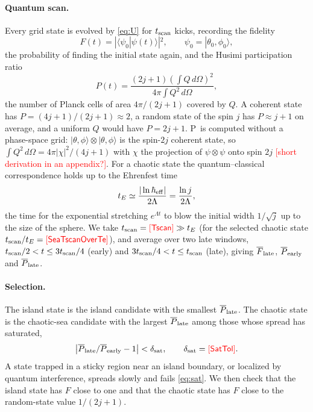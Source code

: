 \documentclass[aps,pra,twocolumn,superscriptaddress,nofootinbib]{revtex4-2}
\newcommand{\PH}[1]{\textcolor{red}{[\textsf{#1}]}}
\newcommand{\num}[1]{\ifcsname Num#1\endcsname\csname Num#1\endcsname\else\PH{#1}\fi}
\newcommand{\tscan}{t_{\rm scan}}          %
\newcommand{\tE}{t_E}                      %
\newcommand{\thz}{\theta_0}                %
\newcommand{\phz}{\phi_0}                  %
\newcommand{\PR}{P}                        %
\newcommand{\Fl}{\overline{F}_{\rm late}}  %
\newcommand{\Pe}{\overline{P}_{\rm early}} %
\newcommand{\Pl}{\overline{P}_{\rm late}}  %
\begin{document}
\paragraph{Quantum scan.}
Every grid state is evolved by \cref{eq:U} for $\tscan$ kicks, recording the fidelity
\begin{equation}\label{eq:F}
  F(t) = |\langle\psi_0|\psi(t)\rangle|^2,\qquad \psi_0 = |\thz,\phz\rangle,
\end{equation}
the probability of finding the initial state again, and the Husimi participation ratio
\begin{equation}\label{eq:PR}
  \PR(t) = \frac{(2j+1)\left(\int Q\,d\Omega\right)^2}{4\pi\int Q^2\,d\Omega},
\end{equation}
the number of Planck cells of area $4\pi/(2j+1)$ covered by $Q$. A coherent state has $\PR=(4j+1)/(2j+1)\approx2$,
a random state of the spin $j$ has $\PR\approx j+1$ on average, and a uniform $Q$ would have $\PR=2j+1$.
\PR\ is computed without a phase-space grid: $|\theta,\phi\rangle\otimes|\theta,\phi\rangle$ is the spin-$2j$
coherent state, so $\int Q^2\,d\Omega = 4\pi|\chi|^2/(4j+1)$ with $\chi$ the projection of $\psi\otimes\psi$ onto
spin $2j$ \PH{short derivation in an appendix?}. For a chaotic state the quantum--classical correspondence holds up
to the Ehrenfest time
\begin{equation}\label{eq:tE}
  \tE \simeq \frac{|\ln\hbar_{\rm eff}|}{2\Lambda} = \frac{\ln j}{2\Lambda},
\end{equation}
the time for the exponential stretching $e^{\Lambda t}$ to blow the initial width $1/\sqrt j$ up to the size of the
sphere. We take $\tscan=\num{Tscan}\gg\tE$ (for the selected chaotic state $\tscan/\tE=\num{SeaTscanOverTe}$), and
average over two late windows, $\tscan/2<t\le3\tscan/4$ (early) and $3\tscan/4<t\le\tscan$ (late), giving $\Fl$,
$\Pe$ and $\Pl$.

\paragraph{Selection.}
The island state is the island candidate with the smallest $\Pl$. The chaotic state is the chaotic-sea candidate with
the largest $\Pl$ among those whose spread has saturated,
\begin{equation}\label{eq:sat}
  \left|\Pl/\Pe-1\right| < \delta_{\rm sat},\qquad \delta_{\rm sat}=\num{SatTol}.
\end{equation}
A state trapped in a sticky region near an island boundary, or localized by quantum interference, spreads slowly and
fails \cref{eq:sat}. We then check that the island state has $F$ close to one and that the chaotic state has $F$ close
to the random-state value $1/(2j+1)$.
\end{document}
